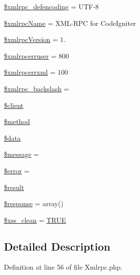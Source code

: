 \begin{DoxyCompactItemize}
\item 
\mbox{\hyperlink{class_c_i___xmlrpc_a7a31af447cebbb81b1f3c5581cd90d5a}{\$xmlrpc\+\_\+defencoding}} = \textquotesingle{}U\+TF-\/8\textquotesingle{}
\item 
\mbox{\hyperlink{class_c_i___xmlrpc_a1311a8891b845bf89b1bc459d54a6312}{\$xmlrpc\+Name}} = \textquotesingle{}X\+ML-\/R\+PC for Code\+Igniter\textquotesingle{}
\item 
\mbox{\hyperlink{class_c_i___xmlrpc_a4130f55bb1f23dcabf9cf3ae5f5a746d}{\$xmlrpc\+Version}} = \textquotesingle{}1.\textquotesingle{}
\item 
\mbox{\hyperlink{class_c_i___xmlrpc_a45bf41f1e861f94e04f463a638e5abf5}{\$xmlrpcerruser}} = 800
\item 
\mbox{\hyperlink{class_c_i___xmlrpc_af2500be600bfad88988409e6ff64c01c}{\$xmlrpcerrxml}} = 100
\item 
\mbox{\hyperlink{class_c_i___xmlrpc_a2bfcef776e3e3cd8f7700e375c6ccaec}{\$xmlrpc\+\_\+backslash}} = \textquotesingle{}\textquotesingle{}
\item 
\mbox{\hyperlink{class_c_i___xmlrpc_ad1405dc1ba2e288764378e79bff7a87d}{\$client}}
\item 
\mbox{\hyperlink{class_c_i___xmlrpc_a12661b2fc0f57f97e30a1620889ce9c6}{\$method}}
\item 
\mbox{\hyperlink{class_c_i___xmlrpc_a6efc15b5a2314dd4b5aaa556a375c6d6}{\$data}}
\item 
\mbox{\hyperlink{class_c_i___xmlrpc_abf17cb2dba2ed17cb28aa5f37deb5293}{\$message}} = \textquotesingle{}\textquotesingle{}
\item 
\mbox{\hyperlink{class_c_i___xmlrpc_aeba2ab722cedda53dbb7ec1a59f45550}{\$error}} = \textquotesingle{}\textquotesingle{}
\item 
\mbox{\hyperlink{class_c_i___xmlrpc_a112ef069ddc0454086e3d1e6d8d55d07}{\$result}}
\item 
\mbox{\hyperlink{class_c_i___xmlrpc_af4b6fb1bbc77ccc05f10da3b16935b99}{\$response}} = array()
\item 
\mbox{\hyperlink{class_c_i___xmlrpc_a0f2ee8861c0b3164a5c6e126dd98c0cc}{\$xss\+\_\+clean}} = \mbox{\hyperlink{constants_8php_ae04a3efe6aa42044f803ee90c2277846}{T\+R\+UE}}
\end{DoxyCompactItemize}


\subsection{Detailed Description}


Definition at line 56 of file Xmlrpc.\+php.



